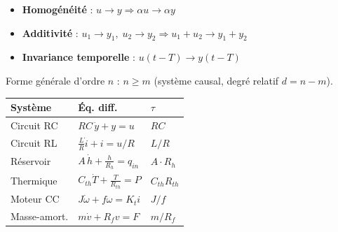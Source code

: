 \begin{tcolorbox}[colback=ch1blue!5,colframe=ch1blue!75!black,title={Lin\'earit\'e \& Superposition (LTI)}]
\begin{itemize}
  \item \textbf{Homog\'en\'eit\'e} : $u \to y \Rightarrow \alpha u \to \alpha y$
  \item \textbf{Additivit\'e} : $u_1 \to y_1,\; u_2 \to y_2 \Rightarrow u_1{+}u_2 \to y_1{+}y_2$
  \item \textbf{Invariance temporelle} : $u(t{-}T) \to y(t{-}T)$
\end{itemize}
\end{tcolorbox}

\begin{tcolorbox}[colback=ch1blue!5,colframe=ch1blue!75!black,title={Mod\'elisation par \'eq. diff\'erentielle}]
Forme g\'en\'erale d'ordre $n$ :
$n \geq m$ (syst\`eme causal, degr\'e relatif $d = n - m$).
\begin{center}
\renewcommand{\arraystretch}{1.05}
\scriptsize
\begin{tabular}{@{}lll@{}}
\toprule
Syst\`eme & \'Eq. diff. & $\tau$ \\
\midrule
Circuit RC & $RC\,\dot{y} + y = u$ & $RC$ \\
Circuit RL & $\frac{L}{R}\dot{i} + i = u/R$ & $L/R$ \\
R\'eservoir & $A\,\dot{h} + \frac{h}{R_h} = q_{in}$ & $A \cdot R_h$ \\
Thermique & $C_{th}\dot{T} + \frac{T}{R_{th}} = P$ & $C_{th}R_{th}$ \\
Moteur CC & $J\dot{\omega} + f\omega = K_t i$ & $J/f$ \\
Masse-amort. & $m\dot{v} + R_f v = F$ & $m/R_f$ \\
\bottomrule
\end{tabular}
\end{center}
\end{tcolorbox}

\begin{tcolorbox}[colback=ch1blue!5,colframe=ch1blue!75!black,title={Gain statique}]
\end{tcolorbox}


